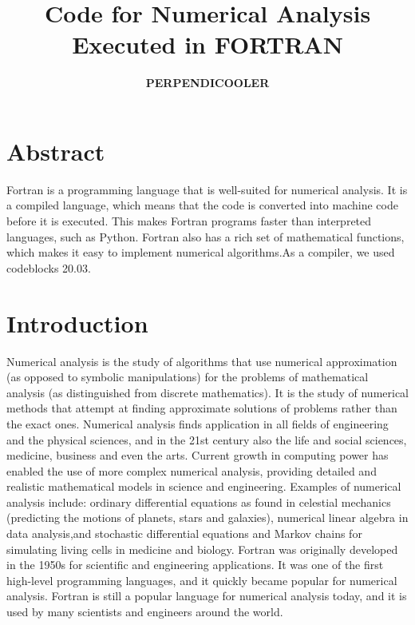 \documentclass{article}
\author{\textbf{PERPENDICOOLER}}
\date{}
\title{\textbf {Code for Numerical Analysis Executed in FORTRAN }}
\begin{document}
\maketitle

\section*{Abstract}
Fortran is a programming language that is well-suited for numerical analysis. It is a compiled language, which means that the code is converted into machine code before it is executed. This makes Fortran programs faster than interpreted languages, such as Python. Fortran also has a rich set of mathematical functions, which makes it easy to implement numerical algorithms.As a compiler, we used codeblocks 20.03.
\section*{Introduction}
Numerical analysis is the study of algorithms that use numerical approximation (as opposed to symbolic manipulations) for the problems of mathematical analysis (as distinguished from discrete mathematics). It is the study of numerical methods that attempt at finding approximate solutions of problems rather than the exact ones. Numerical analysis finds application in all fields of engineering and the physical sciences, and in the 21st century also the life and social sciences, medicine, business and even the arts. Current growth in computing power has enabled the use of more complex numerical analysis, providing detailed and realistic mathematical models in science and engineering. Examples of numerical analysis include: ordinary differential equations as found in celestial mechanics (predicting the motions of planets, stars and galaxies), numerical linear algebra in data analysis,and stochastic differential equations and Markov chains for simulating living cells in medicine and biology.
Fortran was originally developed in the 1950s for scientific and engineering applications. It was one of the first high-level programming languages, and it quickly became popular for numerical analysis. Fortran is still a popular language for numerical analysis today, and it is used by many scientists and engineers around the world.
\newpage
\tableofcontents
\newpage
\end{document}
